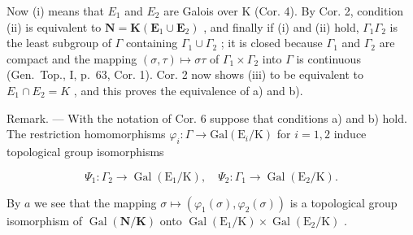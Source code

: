 Now (i) means that \(E_{1}\) and \(E_{2}\) are Galois over K (Cor. 4). By Cor. 2, condition (ii) is equivalent to \(\mathbf{N} = \mathbf{K}(\mathbf{E}_{1} \cup \mathbf{E}_{2})\) , and finally if (i) and (ii) hold, \(\Gamma_{1}\Gamma_{2}\) is the least subgroup of \(\Gamma\) containing \(\Gamma_{1} \cup \Gamma_{2}\) ; it is closed because \(\Gamma_{1}\) and \(\Gamma_{2}\) are compact and the mapping \((\sigma, \tau) \mapsto \sigma\tau\) of \(\Gamma_{1} \times \Gamma_{2}\) into \(\Gamma\) is continuous (Gen.~Top., I, p.~63, Cor. 1). Cor. 2 now shows (iii) to be equivalent to \(E_{1} \cap E_{2} = K\) , and this proves the equivalence of a) and b).

Remark. --- With the notation of Cor. 6 suppose that conditions a) and b) hold. The restriction homomorphisms \(\varphi_{i}:\Gamma\to\mathrm{Gal}(\mathrm{E}_{i}/\mathrm{K})\) for \(i=1,2\) induce topological group isomorphisms

\[
\Psi_ {1}: \Gamma_ {2} \rightarrow \operatorname{Gal} \left(\mathrm{E} _ {1} / \mathrm{K}\right), \quad \Psi_ {2}: \Gamma_ {1} \rightarrow \operatorname{Gal} \left(\mathrm{E} _ {2} / \mathrm{K}\right).
\]

By \(a\) we see that the mapping \(\sigma \mapsto (\varphi_1(\sigma), \varphi_2(\sigma))\) is a topological group isomorphism of \(\operatorname{Gal}(\mathbf{N}/\mathbf{K})\) onto \(\operatorname{Gal}(\mathrm{E}_1/\mathrm{K}) \times \operatorname{Gal}(\mathrm{E}_2/\mathrm{K})\) .
